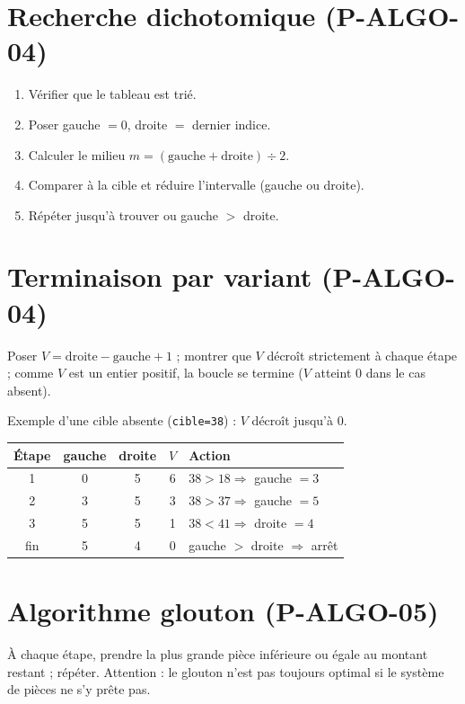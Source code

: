 \documentclass[a4paper,11pt]{article}
\begin{document}

\section*{Recherche dichotomique (P-ALGO-04)}
\begin{enumerate}[nosep]
  \item Vérifier que le tableau est trié.
  \item Poser gauche $=0$, droite $=$ dernier indice.
  \item Calculer le milieu $m = (\text{gauche}+\text{droite}) \div 2$.
  \item Comparer à la cible et réduire l'intervalle (gauche ou droite).
  \item Répéter jusqu'à trouver ou gauche $>$ droite.
\end{enumerate}

\section*{Terminaison par variant (P-ALGO-04)}
Poser $V = \text{droite} - \text{gauche} + 1$ ; montrer que $V$ décroît strictement à chaque étape ; comme $V$ est un entier positif, la boucle se termine ($V$ atteint $0$ dans le cas absent).


\noindent Exemple d'une cible absente (\texttt{cible=38}) : $V$ décroît jusqu'à $0$.
\begin{center}
\begin{tabular}{ccccl}
\toprule
Étape & gauche & droite & $V$ & Action \\
\midrule
1 & 0 & 5 & 6 & $38 > 18 \Rightarrow$ gauche $= 3$ \\
2 & 3 & 5 & 3 & $38 > 37 \Rightarrow$ gauche $= 5$ \\
3 & 5 & 5 & 1 & $38 < 41 \Rightarrow$ droite $= 4$ \\
fin & 5 & 4 & 0 & gauche $>$ droite $\Rightarrow$ arrêt \\
\bottomrule
\end{tabular}
\end{center}

\section*{Algorithme glouton (P-ALGO-05)}
À chaque étape, prendre la plus grande pièce inférieure ou égale au montant restant ; répéter. Attention : le glouton n'est pas toujours optimal si le système de pièces ne s'y prête pas.
\end{document}
